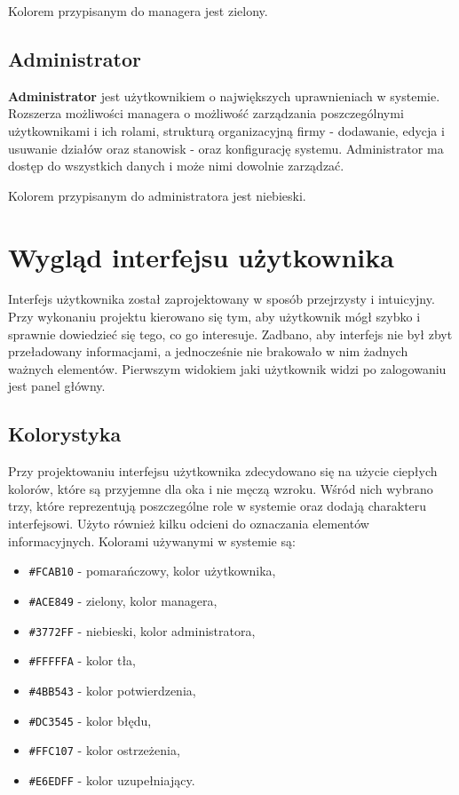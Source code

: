 Kolorem przypisanym do managera jest zielony.

\subsection{Administrator}

\textbf{Administrator} jest użytkownikiem o największych uprawnieniach w systemie. Rozszerza możliwości managera o możliwość zarządzania poszczególnymi użytkownikami i ich rolami, strukturą organizacyjną firmy - dodawanie, edycja i usuwanie działów oraz stanowisk - oraz konfigurację systemu. Administrator ma dostęp do wszystkich danych i może nimi dowolnie zarządzać.

Kolorem przypisanym do administratora jest niebieski.

\section{Wygląd interfejsu użytkownika}

Interfejs użytkownika został zaprojektowany w sposób przejrzysty i intuicyjny. Przy wykonaniu projektu kierowano się tym, aby użytkownik mógł szybko i sprawnie dowiedzieć się tego, co go interesuje. Zadbano, aby interfejs nie był zbyt przeładowany informacjami, a jednocześnie nie brakowało w nim żadnych ważnych elementów. Pierwszym widokiem jaki użytkownik widzi po zalogowaniu jest panel główny.

\subsection{Kolorystyka}

Przy projektowaniu interfejsu użytkownika zdecydowano się na użycie ciepłych kolorów, które są przyjemne dla oka i nie męczą wzroku. Wśród nich wybrano trzy, które reprezentują poszczególne role w systemie oraz dodają charakteru interfejsowi. Użyto również kilku odcieni do oznaczania elementów informacyjnych. Kolorami używanymi w systemie są:
\begin{itemize}
    \item \texttt{\#FCAB10} - pomarańczowy, kolor użytkownika,
    \item \texttt{\#ACE849} - zielony, kolor managera,
    \item \texttt{\#3772FF} - niebieski, kolor administratora,
    \item \texttt{\#FFFFFA} - kolor tła,
    \item \texttt{\#4BB543} - kolor potwierdzenia,
    \item \texttt{\#DC3545} - kolor błędu,
    \item \texttt{\#FFC107} - kolor ostrzeżenia,
    \item \texttt{\#E6EDFF} - kolor uzupełniający.
\end{itemize}

